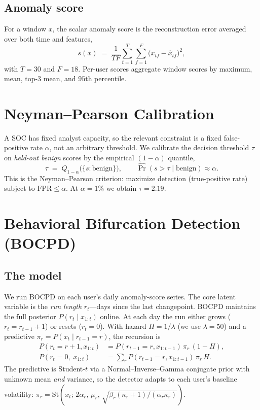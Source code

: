 \documentclass[11pt]{article}
\begin{document}
\subsection{Anomaly score}
For a window $x$, the scalar anomaly score is the reconstruction error
averaged over both time and features,
\begin{equation}
  s(x) \;=\; \frac{1}{T F}\sum_{t=1}^{T}\sum_{f=1}^{F}\bigl(x_{tf}-\hat{x}_{tf}\bigr)^2 ,
  \label{eq:scalar}
\end{equation}
with $T=30$ and $F=18$. Per-user scores aggregate window scores by
maximum, mean, top-$3$ mean, and $95$th percentile.

\section{Neyman--Pearson Calibration}

A SOC has fixed analyst capacity, so the relevant constraint is a fixed
false-positive rate $\alpha$, not an arbitrary threshold. We calibrate the
decision threshold $\tau$ on \emph{held-out benign} scores by the
empirical $(1-\alpha)$ quantile,
\begin{equation}
  \tau \;=\; Q_{1-\alpha}\bigl(\{s : \text{benign}\}\bigr),
  \qquad \widehat{\Pr}(s>\tau \mid \text{benign}) \approx \alpha .
\end{equation}
This is the Neyman--Pearson criterion: maximize detection (true-positive
rate) subject to $\text{FPR}\le\alpha$. At $\alpha=1\%$ we obtain
$\tau=2.19$.

\section{Behavioral Bifurcation Detection (BOCPD)}
\label{sec:bocpd}

\subsection{The model}
We run BOCPD \cite{adams2007} on each user's daily anomaly-score series.
The core latent variable is the \emph{run length} $r_t$---days since the
last changepoint. BOCPD maintains the full posterior $P(r_t \mid x_{1:t})$
online. At each day the run either grows ($r_t=r_{t-1}+1$) or resets
($r_t=0$). With hazard $H=1/\lambda$ (we use $\lambda=50$) and a predictive
$\pi_r=P(x_t\mid r_{t-1}=r)$, the recursion is
\begin{align}
  P(r_t = r{+}1, x_{1:t}) &= P(r_{t-1}=r, x_{1:t-1})\,\pi_r\,(1-H), \\
  P(r_t = 0,\; x_{1:t})   &= \textstyle\sum_r P(r_{t-1}=r, x_{1:t-1})\,\pi_r\,H .
\end{align}
The predictive is Student-$t$ via a Normal--Inverse--Gamma conjugate prior
with unknown mean \emph{and} variance, so the detector adapts to each
user's baseline volatility:
$\pi_r = \mathrm{St}\!\left(x_t;\,2\alpha_r,\,\mu_r,\,
\sqrt{\beta_r(\kappa_r{+}1)/(\alpha_r\kappa_r)}\right)$.
\end{document}
